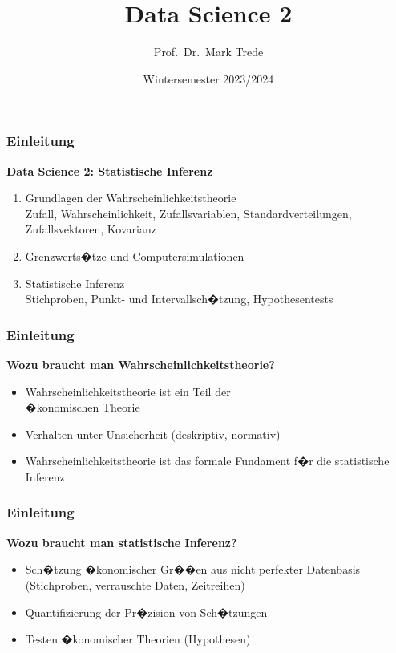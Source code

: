\documentclass[12pt,show notes]{beamer}
\begin{document}
\title{Data Science 2}
\author{Prof.~Dr.~Mark Trede}
\date{Wintersemester 2023/2024}
\maketitle

\begin{frame}
\frametitle{Einleitung}
\textbf{Data Science 2: Statistische Inferenz}\\\medskip
\begin{enumerate}
\item Grundlagen der Wahrscheinlichkeitstheorie\\
{\footnotesize Zufall, Wahrscheinlichkeit, Zufallsvariablen, Standardverteilungen,
Zufallsvektoren, Kovarianz}
\item Grenzwerts�tze und Computersimulationen
\item Statistische Inferenz\\
{\footnotesize Stichproben, Punkt- und Intervallsch�tzung, Hypothesentests}
\end{enumerate}
\end{frame}

\begin{frame}
\frametitle{Einleitung}
\textbf{Wozu braucht man Wahrscheinlichkeitstheorie?}\\\medskip
\begin{itemize}
\item Wahrscheinlichkeitstheorie ist ein Teil der\\  �konomischen Theorie
\item Verhalten unter Unsicherheit (deskriptiv, normativ)
\item Wahrscheinlichkeitstheorie ist das formale Fundament 
f�r die statistische Inferenz
\end{itemize}
\end{frame}

\begin{frame}
\frametitle{Einleitung}
\textbf{Wozu braucht man statistische Inferenz?}\\\medskip
\begin{itemize}
\item Sch�tzung �konomischer Gr��en aus nicht perfekter Datenbasis (Stichproben, verrauschte Daten, Zeitreihen)
\item Quantifizierung der Pr�zision von Sch�tzungen
\item Testen �konomischer Theorien (Hypothesen)
\end{itemize}
\end{frame}
\end{document}
